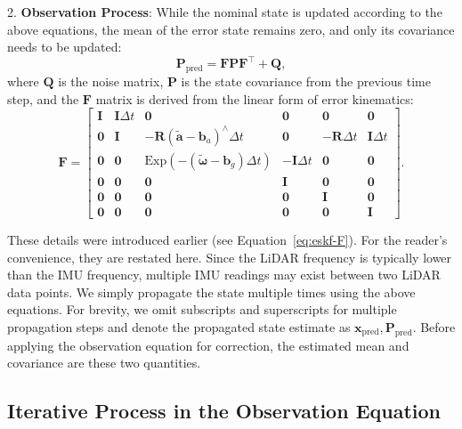 2. \textbf{Observation Process}: While the nominal state is updated according to the above equations, the mean of the error state remains zero, and only its covariance needs to be updated:  
\begin{equation}\label{key}  
	\mathbf{P}_{\text{pred}} = \mathbf{F} \mathbf{P} \mathbf{F}^\top + \mathbf{Q},  
\end{equation}  
where $\mathbf{Q}$ is the noise matrix, $\mathbf{P}$ is the state covariance from the previous time step, and the $\mathbf{F}$ matrix is derived from the linear form of error kinematics:  
\begin{equation}  
	\mathbf{F} = \begin{bmatrix}  
		\mathbf{I} & \mathbf{I} \Delta t & \mathbf{0} & \mathbf{0} & \mathbf{0} & \mathbf{0} \\  
		\mathbf{0} & \mathbf{I} & - \mathbf{R}(\tilde{\mathbf{a}} - \mathbf{b}_a)^\wedge \Delta t & \mathbf{0} & -\mathbf{R} \Delta t & \mathbf{I} \Delta t \\  
		\mathbf{0} & \mathbf{0} & \mathrm{Exp}\left( -(\tilde{\boldsymbol{\omega}} - \mathbf{b}_g) \Delta t \right)   
		& -\mathbf{I} \Delta t & \mathbf{0} &\mathbf{0} \\  
		\mathbf{0} & \mathbf{0} & \mathbf{0} & \mathbf{I} & \mathbf{0} & \mathbf{0} \\  
		\mathbf{0} & \mathbf{0} & \mathbf{0} & \mathbf{0} & \mathbf{I} & \mathbf{0} \\  
		\mathbf{0} & \mathbf{0} & \mathbf{0} & \mathbf{0} & \mathbf{0} & \mathbf{I}  
	\end{bmatrix}.  
\end{equation}  

These details were introduced earlier (see Equation~\eqref{eq:eskf-F}). For the reader's convenience, they are restated here. Since the LiDAR frequency is typically lower than the IMU frequency, multiple IMU readings may exist between two LiDAR data points. We simply propagate the state multiple times using the above equations. For brevity, we omit subscripts and superscripts for multiple propagation steps and denote the propagated state estimate as $\mathbf{x}_{\mathrm{pred}}, \mathbf{P}_{\mathrm{pred}}$. Before applying the observation equation for correction, the estimated mean and covariance are these two quantities.

\subsection{Iterative Process in the Observation Equation}  

